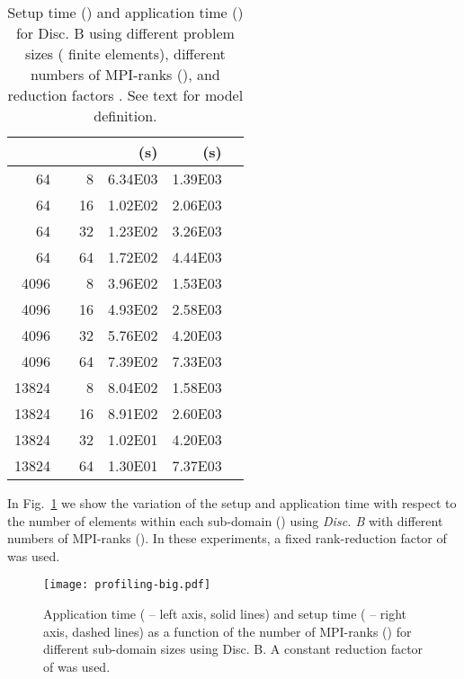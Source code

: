 \documentclass[]{siamart0216}
\begin{document}
\begin{table}[h!]
\centering
\caption{Setup time () and application time () for Disc. B using different problem sizes ( finite elements), different numbers of MPI-ranks (), and reduction factors . 
See text for model definition.}
\begin{tabular}{r r r r r r}
\toprule
     &    &    & (s) & (s)\\
\midrule
64                       &         &8            &6.34E03 &1.39E03   \\
64                       &         &16          &1.02E02 &2.06E03  \\
64                       &         &32          &1.23E02  &3.26E03  \\
64                       &         &64          &1.72E02 &4.44E03    \\
\midrule
4096                   &         &8            &3.96E02 &1.53E03   \\
4096                   &         &16          &4.93E02 &2.58E03   \\
4096                   &         &32          &5.76E02 &4.20E03   \\
4096                   &         &64          &7.39E02 &7.33E03   \\
\midrule
13824                 &         &8            &8.04E02 &1.58E03   \\
13824                 &         &16          &8.91E02 &2.60E03   \\
13824                 &         &32          &1.02E01 &4.20E03   \\
13824                 &         &64          &1.30E01 &7.37E03   \\
\bottomrule
\end{tabular}
\label{tab:telescopeB}
\end{table}

In Fig.~\ref{fig:agglomprof} we show the variation of the setup and application time with respect to the  number of elements 
within each sub-domain () using \emph{Disc. B} with different numbers of MPI-ranks ().
In these experiments, a fixed rank-reduction factor of  was used. 
\begin{figure}[h!]
\centering
\texttt{[image: profiling-big.pdf]}
\caption{Application time ( -- left axis, solid lines) and setup time ( -- right axis, dashed lines) as a function of 
the number of MPI-ranks () for different sub-domain sizes using Disc. B.
A constant reduction factor of  was used. \label{fig:agglomprof}}
\end{figure}
\end{document}
